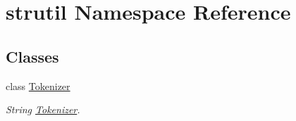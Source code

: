 \hypertarget{namespacestrutil}{}\section{strutil Namespace Reference}
\label{namespacestrutil}
\subsection*{Classes}
\begin{DoxyCompactItemize}
\item 
class \hyperlink{classstrutil_1_1_tokenizer}{Tokenizer}
\begin{DoxyCompactList}\small\item\em String \hyperlink{classstrutil_1_1_tokenizer}{Tokenizer}. \end{DoxyCompactList}\end{DoxyCompactItemize}
